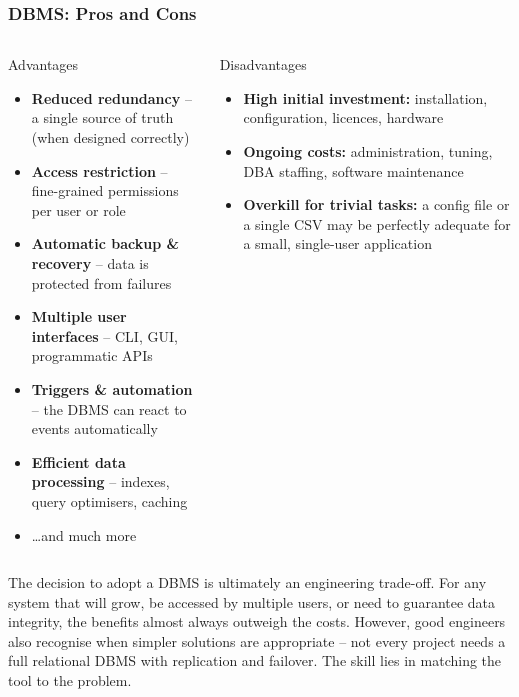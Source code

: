 \begin{frame}
  \frametitle{DBMS: Pros and Cons}

  \begin{columns}
      \begin{block}{Advantages}
        \begin{itemize}
          \item \textbf{Reduced redundancy} -- a single source of truth (when designed correctly)
          \item \textbf{Access restriction} -- fine-grained permissions per user or role
          \item \textbf{Automatic backup \& recovery} -- data is protected from failures
          \item \textbf{Multiple user interfaces} -- CLI, GUI, programmatic APIs
          \item \textbf{Triggers \& automation} -- the DBMS can react to events automatically
          \item \textbf{Efficient data processing} -- indexes, query optimisers, caching
          \item \ldots and much more
        \end{itemize}
      \end{block}

      \begin{alertblock}{Disadvantages}
        \begin{itemize}
          \item \textbf{High initial investment:} installation, configuration, licences, hardware
          \item \textbf{Ongoing costs:} administration, tuning, DBA staffing, software maintenance
          \item \textbf{Overkill for trivial tasks:} a config file or a single CSV may be perfectly adequate for a small, single-user application
        \end{itemize}
      \end{alertblock}
  \end{columns}

  \vspace{0.5em}
  The decision to adopt a DBMS is ultimately an engineering trade-off. For any system that will grow, be accessed by multiple users, or need to guarantee data integrity, the benefits almost always outweigh the costs. However, good engineers also recognise when simpler solutions are appropriate -- not every project needs a full relational DBMS with replication and failover. The skill lies in matching the tool to the problem.
\end{frame}
